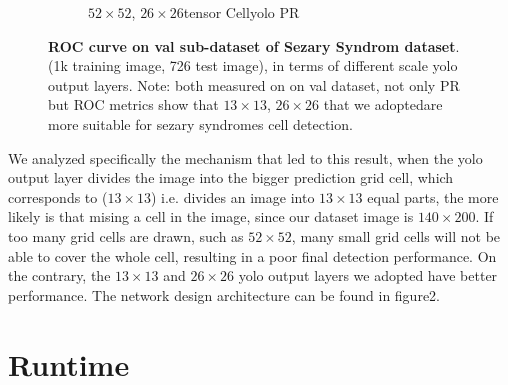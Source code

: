 \begin{figure}[h]
\begin{center}
\begin{subfigure}[b]{0.49\textwidth}
			\caption{$52 \times 52$, $26 \times 26$tensor Cellyolo PR }
			\label{fig:cellnet}
		\end{subfigure}
	\end{center}
	\caption{\textbf{ROC curve on val sub-dataset of Sezary Syndrom dataset}. (1k training image, 726 test image), in terms of different scale yolo output layers. Note: both measured on on val dataset, not only PR but ROC metrics  show that $13\times13$, $26\times26$ that we adoptedare more suitable for sezary syndromes cell detection.}
\end{figure}

We analyzed specifically the mechanism that led to this result, when the yolo output layer divides the image into the bigger prediction grid cell, which corresponds to ($13\times13$) i.e. divides an image into $13\times13 $ equal parts, the more likely is that mising a cell in the image, since our dataset image is $140\times200$. If too many grid cells are drawn, such as $ 52\times52$, many small grid cells will not be able to cover the whole cell, resulting in a poor final detection performance. On the contrary, the $13\times13$ and $ 26\times26$ yolo output layers we adopted have better performance. The network design architecture can be found in figure2.



\section{Runtime}
\label{sec:ipsum}






